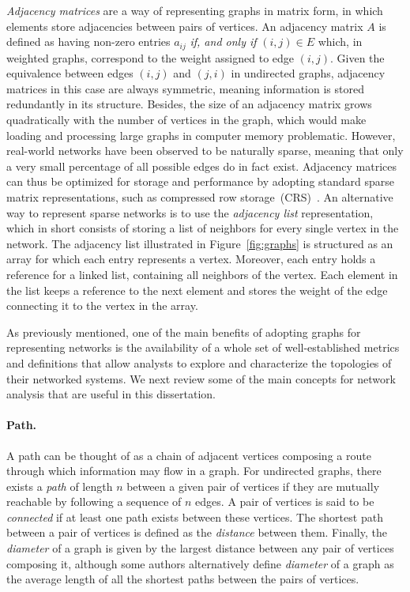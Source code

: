 \textit{Adjacency matrices} are a way of representing graphs in matrix form, in which elements store adjacencies between pairs of vertices.
An adjacency matrix $A$ is defined as having non-zero entries $a_{i j}$\textit{ if, and only if } $(i,j)\in E$ which, in weighted graphs, correspond to the weight assigned to edge $(i,j)$.
Given the equivalence between edges $(i,j)$ and $(j,i)$ in undirected graphs, adjacency matrices in this case are always symmetric, meaning information is stored redundantly in its structure.
%
Besides, the size of an adjacency matrix grows quadratically with the number of vertices in the graph, which would make loading and processing large graphs in computer memory problematic.
However, real-world networks have been observed to be naturally sparse, meaning that only a very small percentage of all possible edges do in fact exist.
Adjacency matrices can thus be optimized for storage and performance by adopting standard sparse matrix representations, such as compressed row storage~(CRS)~\cite{Saad2003}.
An alternative way to represent sparse networks is to use the \textit{adjacency list} representation, which in short consists of storing a list of neighbors for every single vertex in the network. 
The adjacency list illustrated in Figure~\ref{fig:graphs} is structured as an array for which each entry represents a vertex.
Moreover, each entry holds a reference for a linked list, containing all neighbors of the vertex. Each element in the list keeps a reference to the next element and stores the weight of the edge connecting it to the vertex in the array.

As previously mentioned, one of the main benefits of adopting graphs for representing networks is the availability of a whole set of well-established metrics and definitions that allow analysts to explore and characterize the topologies of their networked systems.
We next review some of the main concepts for network analysis that are useful in this dissertation.

\paragraph*{Path.}
A path can be thought of as a chain of adjacent vertices composing a route through which information may flow in a graph.
For undirected graphs, there exists a \textit{path} of length $n$ between a given pair of vertices if they are mutually reachable by following a sequence of $n$ edges.
A pair of vertices is said to be \textit{connected} if at least one path exists between these vertices. The shortest path between a pair of vertices is defined as the \textit{distance} between them.
Finally, the \textit{diameter} of a graph is given by the largest distance between any pair of vertices composing it, although some authors alternatively define \textit{diameter} of a graph as the average length of all the shortest paths between the pairs of vertices.

